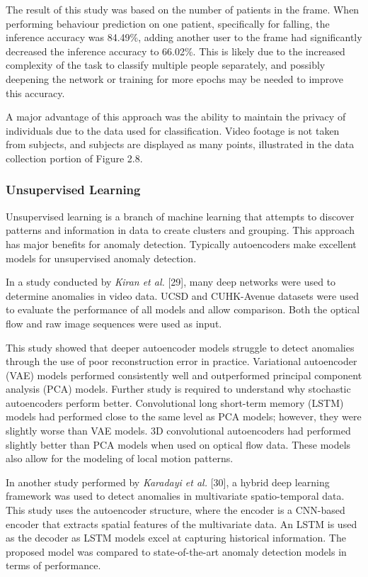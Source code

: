 The result of this study was based on the number of patients in the frame. When performing behaviour prediction on one patient, specifically for falling, the inference accuracy was 84.49\%, adding another user to the frame had significantly decreased the inference accuracy to 66.02\%. This is likely due to the increased complexity of the task to classify multiple people separately, and possibly deepening the network or training for more epochs may be needed to improve this accuracy. 

A major advantage of this approach was the ability to maintain the privacy of individuals due to the data used for classification. Video footage is not taken from subjects, and subjects are displayed as many points, illustrated in the data collection portion of Figure 2.8.

\subsubsection{Unsupervised Learning}
Unsupervised learning is a branch of machine learning that attempts to discover patterns and information in data to create clusters and grouping. This approach has major benefits for anomaly detection. Typically autoencoders make excellent models for unsupervised anomaly detection.

In a study conducted by \textit{Kiran et al.} [29], many deep networks were used to determine anomalies in video data. UCSD and CUHK-Avenue datasets were used to evaluate the performance of all models and allow comparison. Both the optical flow and raw image sequences were used as input.

This study showed that deeper autoencoder models struggle to detect anomalies through the use of poor reconstruction error in practice. Variational autoencoder (VAE) models performed consistently well and outperformed principal component analysis (PCA) models. Further study is required to understand why stochastic autoencoders perform better. Convolutional long short-term memory (LSTM) models had performed close to the same level as PCA models; however, they were slightly worse than VAE models. 3D convolutional autoencoders had performed slightly better than PCA models when used on optical flow data. These models also allow for the modeling of local motion patterns. 

In another study performed by \textit{Karadayi et al.} [30], a hybrid deep learning framework was used to detect anomalies in multivariate spatio-temporal data. This study uses the autoencoder structure, where the encoder is a CNN-based encoder that extracts spatial features of the multivariate data. An LSTM is used as the decoder as LSTM models excel at capturing historical information. The proposed model was compared to state-of-the-art anomaly detection models in terms of performance.


